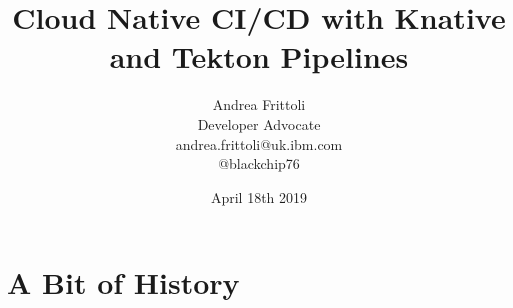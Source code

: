 \documentclass[aspectratio=169,11pt,hyperref={colorlinks=true}]{beamer}
\title{Cloud Native CI/CD with Knative and Tekton Pipelines}
\date[devoxxfr]{April 18th 2019}
\author[Andrea]{
  Andrea Frittoli \\
  Developer Advocate \\
  andrea.frittoli@uk.ibm.com \\
  @blackchip76
}
\institute[devoxxfr]{
  Devoxx France, 8ème édition
}
\begin{document}
\begin{frame}[noframenumbering]
\titlepage{}
\end{frame}





\section{A Bit of History}
\end{document}
